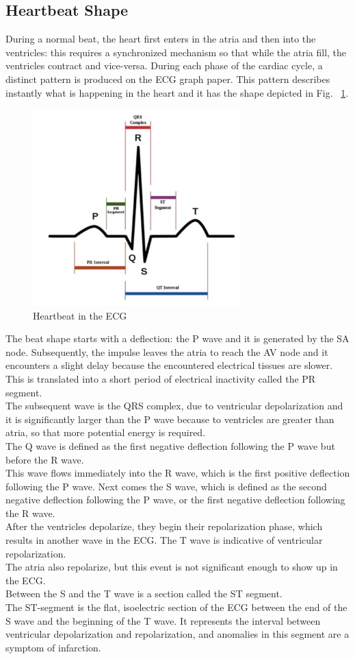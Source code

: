 \documentclass[LaM,binding=0.6cm]{sapthesis}
\begin{document}
\subsection{Heartbeat Shape}
During a normal beat, the heart first enters in the atria and then into the ventricles: this requires a synchronized mechanism so that while the atria fill, the ventricles contract and vice-versa. During each phase of the cardiac cycle, a distinct pattern is produced on the ECG graph paper. This pattern describes instantly what is happening in the heart and it has the shape depicted in Fig. ~\ref{fig:beatshape}.
\begin{figure}[H]  \centering
    \includegraphics[width=80mm,scale=0.7]{beatshape}
    \caption{Heartbeat in the ECG}
    \label{fig:beatshape}
\end{figure}
The beat shape starts with a deflection: the P wave and it is generated by the SA node. Subsequently, the impulse leaves the atria to reach the AV node and it encounters a slight delay because the encountered electrical tissues are slower. This is translated into a short period of electrical inactivity called the PR segment.\\The subsequent wave is the QRS complex, due to ventricular depolarization and it is significantly larger than the P wave because to ventricles are greater than atria, so that more potential energy is required.\\The Q wave is defined as the first negative deflection following the P wave but before the R wave.\\This wave flows immediately into the R wave, which is the first positive deflection following the P wave. Next comes the S wave, which is defined as the second negative deflection following the P wave, or the first negative deflection following the R wave.\\After the ventricles depolarize, they begin their repolarization phase, which results in another wave in the ECG. The T wave is indicative of ventricular repolarization.\\The atria also repolarize, but this event is not significant enough to show up in the ECG.\\Between the S and the T wave is a section called the ST segment.\\The ST-segment is the flat, isoelectric section of the ECG between the end of the S wave and the beginning of the T wave. It represents the interval between ventricular depolarization and repolarization, and anomalies in this segment are a symptom of infarction.
\end{document}
